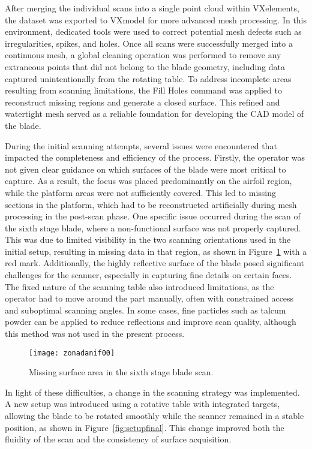 After merging the individual scans into a single point cloud within VXelements, the dataset was exported to VXmodel for more advanced mesh processing. In this environment, dedicated tools were used to correct potential mesh defects such as irregularities, spikes, and holes. Once all scans were successfully merged into a continuous mesh, a global cleaning operation was performed to remove any extraneous points that did not belong to the blade geometry, including data captured unintentionally from the rotating table.
To address incomplete areas resulting from scanning limitations, the Fill Holes command was applied to reconstruct missing regions and generate a closed surface. This refined and watertight mesh served as a reliable foundation for developing the CAD model of the blade.

During the initial scanning attempts, several issues were encountered that impacted the completeness and efficiency of the process. Firstly, the operator was not given clear guidance on which surfaces of the blade were most critical to capture. As a result, the focus was placed predominantly on the airfoil region, while the platform areas were not sufficiently covered. This led to missing sections in the platform, which had to be reconstructed artificially during mesh processing in the post-scan phase.
One specific issue occurred during the scan of the sixth stage blade, where a non-functional surface was not properly captured. This was due to limited visibility in the two scanning orientations used in the initial setup, resulting in missing data in that region, as shown in Figure~\ref{fig:zonadanif} with a red mark.
Additionally, the highly reflective surface of the blade posed significant challenges for the scanner, especially in capturing fine details on certain faces. 
The fixed nature of the scanning table also introduced limitations, as the operator had to move around the part manually, often with constrained access and suboptimal scanning angles.
In some cases, fine particles such as talcum powder can be applied to reduce reflections and improve scan quality, although this method was not used in the present process.

\begin{figure}[H]
    \centering
    \texttt{[image: zonadanif00]}
    \caption{ Missing surface area in the sixth stage blade scan.}
    \label{fig:zonadanif}
\end{figure}

In light of these difficulties, a change in the scanning strategy was implemented. 
A new setup was introduced using a rotative table with integrated targets, allowing the blade to be rotated smoothly while the scanner remained in a stable position, as shown in Figure~\ref{fig:setupfinal}. 
This change improved both the fluidity of the scan and the consistency of surface acquisition. 

